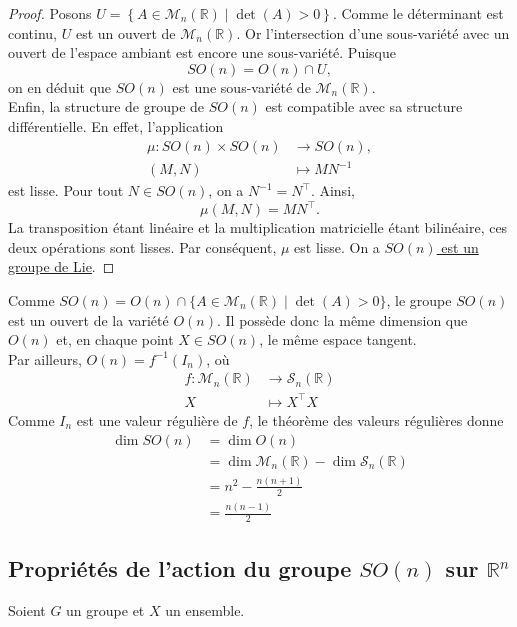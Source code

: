 \documentclass[12pt]{report}
\begin{document}
\begin{proof}
Posons $U=\left\{A\in\mathcal{M}_n(\mathbb{R})\mid \det(A)>0\right\}$. Comme le déterminant est continu, $U$ est un ouvert de $\mathcal{M}_n(\mathbb{R})$. Or l'intersection d'une sous-variété avec un ouvert de l'espace ambiant est encore une sous-variété. Puisque
\[
SO(n)=O(n)\cap U,
\]
on en déduit que $SO(n)$ est une sous-variété de $\mathcal{M}_n(\mathbb{R})$.\\
Enfin, la structure de groupe de $SO(n)$ est compatible avec sa structure différentielle. En effet, l'application
\[
\begin{aligned}
\mu\colon SO(n)\times SO(n)&\longrightarrow SO(n),\\
(M,N)&\longmapsto MN^{-1}
\end{aligned}
\]
est lisse. Pour tout $N\in SO(n)$, on a $N^{-1}=N^\top$. Ainsi,
\[
\mu(M,N)=MN^\top.
\]
La transposition étant linéaire et la multiplication matricielle étant bilinéaire, ces deux opérations sont lisses. Par conséquent, $\mu$ est lisse. On a \underline{$SO(n)$ est un groupe de Lie}.
\end{proof}

\begin{remark}\label{rq:dim/tang}
Comme $SO(n)=O(n)\cap\{A\in\mathcal M_n(\mathbb R)\mid \det(A)>0\}$, le groupe $SO(n)$ est un ouvert de la variété $O(n)$. Il possède donc la même dimension que $O(n)$ et, en chaque point $X\in SO(n)$, le même espace tangent.\\
Par ailleurs, $O(n)=f^{-1}(I_n)$, où
\[
\begin{aligned}
f:\mathcal M_n(\mathbb R)&\longrightarrow\mathcal S_n(\mathbb R)\\
X&\longmapsto X^\top X
\end{aligned}
\]
Comme $I_n$ est une valeur régulière de $f$, le théorème des valeurs régulières donne
\[
\begin{aligned}
\dim SO(n)&=\dim O(n)\\
&=\dim\mathcal M_n(\mathbb R)-\dim\mathcal S_n(\mathbb R)\\
&=n^2-\frac{n(n+1)}{2}\\
&=\frac{n(n-1)}{2}
\end{aligned}
\]
\end{remark}


\subsection{Propriétés de l'action du groupe \texorpdfstring{$SO(n)$}{SO (n)} sur \texorpdfstring{$\mathbb{R}^n$}{Rn}}
Soient $G$ un groupe et $X$ un ensemble.
\end{document}
